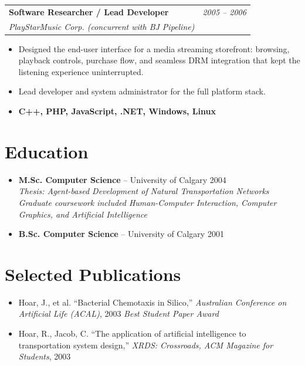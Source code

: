 \documentclass[11pt]{article}
\makeatletter
\newcommand{\tech}[1]{\textcolor{secondary}{\textbf{#1}}}
\newcommand{\experience}[4]{%
  \vspace{4pt}
  \begin{tabular*}{\textwidth}{@{}l@{\extracolsep{\fill}}r@{}}
    \textbf{#1} & \textit{#2} \\
    \textit{\small#3} & \textit{\small#4}
  \end{tabular*}
  \vspace{-4pt}
}
\makeatother
\begin{document}
\experience{Software Researcher / Lead Developer}{2005 -- 2006}{PlayStarMusic Corp. \normalfont\small\textit{(concurrent with BJ Pipeline)}}{}
\begin{itemize}
    \item Designed the end-user interface for a media streaming storefront: browsing, playback controls, purchase flow, and seamless DRM integration that kept the listening experience uninterrupted.
    \item Lead developer and system administrator for the full platform stack.
    \item[] \tech{C++, PHP, JavaScript, .NET, Windows, Linux}
\end{itemize}

\newpage

\section*{Education}
\begin{itemize}
    \item \tech{M.Sc. Computer Science} -- University of Calgary \hfill 2004 \\
    \textit{Thesis: Agent-based Development of Natural Transportation Networks} \\
    \textit{Graduate coursework included Human-Computer Interaction, Computer Graphics, and Artificial Intelligence}
    \item \tech{B.Sc. Computer Science} -- University of Calgary \hfill 2001
\end{itemize}

\section*{Selected Publications}
\begin{itemize}[nosep,leftmargin=*]
    \item Hoar, J., et al. ``Bacterial Chemotaxis in Silico,'' \textit{Australian Conference on Artificial Life (ACAL)}, 2003 \hfill \textit{Best Student Paper Award}
    \item Hoar, R., Jacob, C. ``The application of artificial intelligence to transportation system design,'' \textit{XRDS: Crossroads, ACM Magazine for Students}, 2003
\end{itemize}

\end{document}
